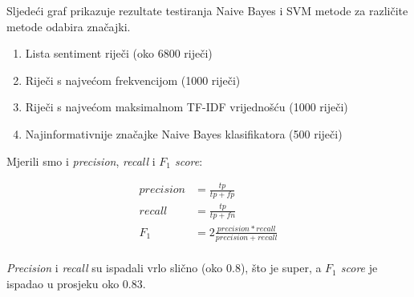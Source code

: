 \documentclass[conference]{IEEEtran}
\begin{document}
Sljedeći graf prikazuje rezultate testiranja Naive Bayes i SVM metode za različite metode odabira značajki.

\begin{enumerate}
	\item Lista sentiment riječi (oko 6800 riječi)
	\item Riječi s najvećom frekvencijom (1000 riječi)
	\item Riječi s najvećom maksimalnom TF-IDF vrijednošću (1000 riječi)
	\item Najinformativnije značajke Naive Bayes klasifikatora (500 riječi)
\end{enumerate}

Mjerili smo i \textit{precision}, \textit{recall} i \textit{$F_1$ score}:

\begin{align*}
  precision &= \frac{tp}{tp + fp}                              \\
  recall    &= \frac{tp}{tp + fn}                              \\
  F_1       &= 2 \frac{precision * recall}{precision + recall} \\
\end{align*}

\textit{Precision} i \textit{recall} su ispadali vrlo slično (oko 0.8), što je
super, a \textit{$F_1$ score} je ispadao u prosjeku oko 0.83.
\end{document}
